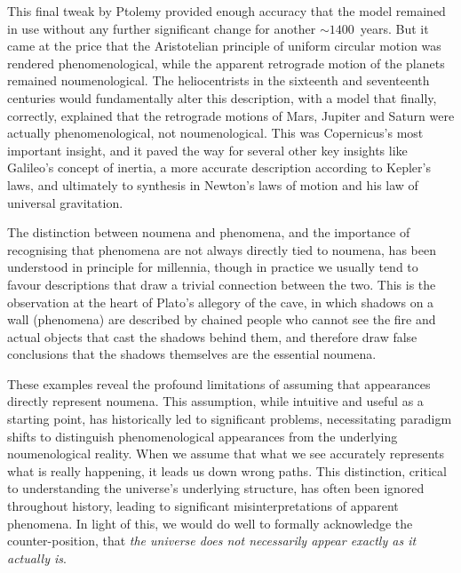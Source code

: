 \documentclass[aps,rmp,groupedaddress,twocolumn,10pt]{revtex4-2}
\begin{document}
This final tweak by Ptolemy provided enough accuracy that the model remained in use without any further significant change for another $\sim1400$~years. But it came at the price that the Aristotelian principle of uniform circular motion was rendered phenomenological, while the apparent retrograde motion of the planets remained noumenological. The heliocentrists in the sixteenth and seventeenth centuries would fundamentally alter this description, with a model that finally, correctly, explained that the retrograde motions of Mars, Jupiter and Saturn were actually phenomenological, not noumenological. This was Copernicus's most important insight, and it paved the way for several other key insights like Galileo's concept of inertia, a more accurate description according to Kepler's laws, and ultimately to synthesis in Newton's laws of motion and his law of universal gravitation.

The distinction between noumena and phenomena, and the importance of recognising that phenomena are not always directly tied to noumena, has been understood in principle for millennia, though in practice we usually tend to favour descriptions that draw a trivial connection between the two. This is the observation at the heart of Plato's allegory of the cave, in which shadows on a wall (phenomena) are described by chained people who cannot see the fire and actual objects that cast the shadows behind them, and therefore draw false conclusions that the shadows themselves are the essential noumena.

These examples reveal the profound limitations of assuming that appearances directly represent noumena. This assumption, while intuitive and useful as a starting point, has historically led to significant problems, necessitating paradigm shifts to distinguish phenomenological appearances from the underlying noumenological reality. When we assume that what we see accurately represents what is really happening, it leads us down wrong paths. This distinction, critical to understanding the universe's underlying structure, has often been ignored throughout history, leading to significant misinterpretations of apparent phenomena. In light of this, we would do well to formally acknowledge the counter-position, that \textit{the universe does not necessarily appear exactly as it actually is}.
\end{document}
